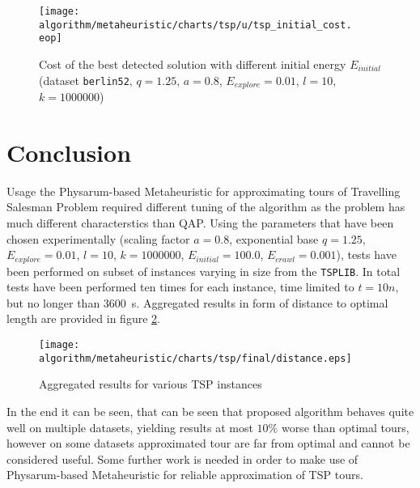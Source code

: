 \begin{figure}
  \centering

  \texttt{[image: algorithm/metaheuristic/charts/tsp/u/tsp\_initial\_cost.\\eop]}

  \caption{Cost of the best detected solution with different initial energy $E_{initial}$ (dataset \texttt{berlin52}, $q=1.25$, $a=0.8$, $E_{explore}=0.01$, $l=10$, $k=1000000$)}
  \label{figure:tsp_initial_cost}
\end{figure}

\section*{Conclusion}

Usage the Physarum-based Metaheuristic for approximating tours of Travelling Salesman Problem required different tuning of the algorithm as the problem has much different characterstics than QAP. Using the parameters that have been chosen experimentally (scaling factor $a=0.8$, exponential base $q=1.25$, $E_{explore}=0.01$, $l=10$, $k=1000000$, $E_{initial}=100.0$, $E_{crawl}=0.001$), tests have been performed on subset of instances varying in size from the \texttt{TSPLIB}. In total tests have been performed ten times for each instance, time limited to $t=10n$, but no longer than 3600~s. Aggregated results in form of distance to optimal length are provided in figure \ref{figure:tsp_final}.

\begin{figure}
  \centering

  \texttt{[image: algorithm/metaheuristic/charts/tsp/final/distance.eps]}

  \caption{Aggregated results for various TSP instances}
  \label{figure:tsp_final}
\end{figure}

In the end it can be seen, that can be seen that proposed algorithm behaves quite well on multiple datasets, yielding results at most $10\%$ worse than optimal tours, however on some datasets approximated tour are far from optimal and cannot be considered useful. Some further work is needed in order to make use of Physarum-based Metaheuristic for reliable approximation of TSP tours.
